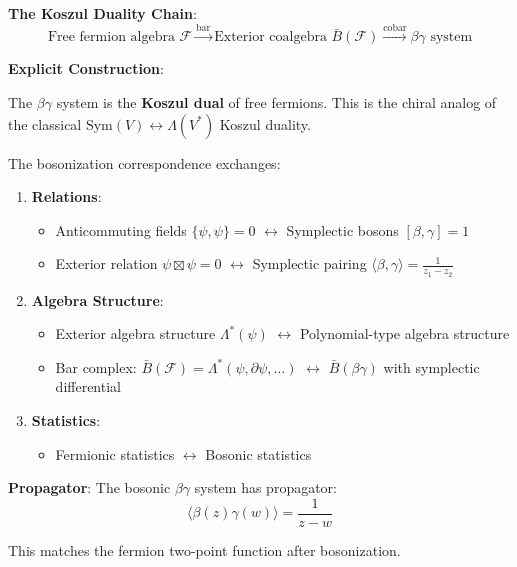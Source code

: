 \begin{example}
\label{ex:fermion-betagamma-bar-cobar}

\textbf{The Koszul Duality Chain}:
$$\text{Free fermion algebra } \mathcal{F} \xrightarrow{\text{bar}} \text{Exterior coalgebra } 
\bar{B}(\mathcal{F}) \xrightarrow{\text{cobar}} \beta\gamma \text{ system}$$

\textbf{Explicit Construction}:

\begin{theorem}
The $\beta\gamma$ system is the \textbf{Koszul dual} of free fermions. This is the chiral analog 
of the classical $\text{Sym}(V) \leftrightarrow \Lambda(V^*)$ Koszul duality.

The bosonization correspondence exchanges:
\begin{enumerate}
\item \textbf{Relations}: 
   \begin{itemize}
   \item Anticommuting fields $\{\psi, \psi\} = 0$ $\leftrightarrow$ Symplectic bosons $[\beta,\gamma] = 1$
   \item Exterior relation $\psi \boxtimes \psi = 0$ $\leftrightarrow$ Symplectic pairing $\langle \beta, \gamma \rangle = \frac{1}{z_1-z_2}$
   \end{itemize}

\item \textbf{Algebra Structure}:
   \begin{itemize}
   \item Exterior algebra structure $\Lambda^*(\psi)$ $\leftrightarrow$ Polynomial-type algebra structure
   \item Bar complex: $\bar{B}(\mathcal{F}) = \Lambda^*(\psi, \partial\psi, \ldots)$ $\leftrightarrow$ $\bar{B}(\beta\gamma)$ with symplectic differential
   \end{itemize}

\item \textbf{Statistics}:
   \begin{itemize}
   \item Fermionic statistics $\leftrightarrow$ Bosonic statistics
   \end{itemize}
\end{enumerate}
\end{theorem}

\textbf{Propagator}: The bosonic $\beta\gamma$ system has propagator:
$$\langle \beta(z) \gamma(w) \rangle = \frac{1}{z - w}$$

This matches the fermion two-point function after bosonization.
\end{example}

